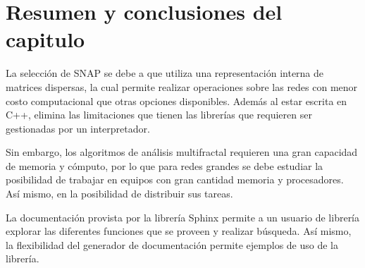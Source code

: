 \section{Resumen y conclusiones del capitulo}

La selección de SNAP se debe a que utiliza una representación interna de matrices dispersas, la cual permite realizar operaciones sobre las redes con menor costo computacional que otras opciones disponibles. Además al estar escrita en C++, elimina las limitaciones que tienen las librerías que requieren ser gestionadas por un interpretador.

Sin embargo, los algoritmos de análisis multifractal requieren una gran capacidad de memoria y cómputo, por lo que para redes grandes se debe estudiar la posibilidad de trabajar en equipos con gran cantidad memoria y procesadores. Así mismo, en la posibilidad de distribuir sus tareas.

La documentación provista por la librería Sphinx permite a un usuario de librería explorar las diferentes funciones que se proveen y realizar búsqueda. Así mismo, la flexibilidad del generador de documentación permite ejemplos de uso de la librería.